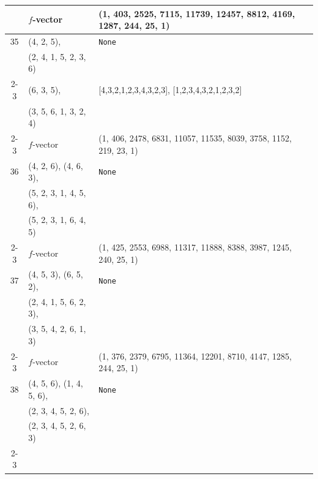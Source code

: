 \documentclass[10pt]{amsart}
\numberwithin{equation}{section}
\theoremstyle{plain}
\theoremstyle{definition}
\theoremstyle{remark}
\begin{document}
{\begin{longtable}{c|l|l}
		& $f$-vector & {(1, 403, 2525, 7115, 11739, 12457, 8812, 4169, 1287, 244, 25, 1)} \\
		\midrule
		
		35 & (4, 2, 5), & \texttt{None} \\
		& (2, 4, 1, 5, 2, 3, 6) &  \\ \cline{2-3}
		
		& (6, 3, 5), & [4,3,2,1,2,3,4,3,2,3], [1,2,3,4,3,2,1,2,3,2] \\
		& (3, 5, 6, 1, 3, 2, 4) &  \\ \cline{2-3}
		
		& $f$-vector & {(1, 406, 2478, 6831, 11057, 11535, 8039, 3758, 1152, 219, 23, 1)} \\
		\midrule
		
		36 & (4, 2, 6), (4, 6, 3), & \texttt{None} \\
		& (5, 2, 3, 1, 4, 5, 6), &  \\
		& (5, 2, 3, 1, 6, 4, 5) &  \\ \cline{2-3}
		
		& $f$-vector & {(1, 425, 2553, 6988, 11317, 11888, 8388, 3987, 1245, 240, 25, 1)} \\
		\midrule
		
		37 & (4, 5, 3), (6, 5, 2), & \texttt{None} \\
		& (2, 4, 1, 5, 6, 2, 3), &  \\
		& (3, 5, 4, 2, 6, 1, 3) &  \\ \cline{2-3}
		
		& $f$-vector & {(1, 376, 2379, 6795, 11364, 12201, 8710, 4147, 1285, 244, 25, 1)} \\
		\midrule
		
		38 & (4, 5, 6), (1, 4, 5, 6), & \texttt{None} \\
		& (2, 3, 4, 5, 2, 6), &  \\
		& (2, 3, 4, 5, 2, 6, 3) &  \\ \cline{2-3}
		

\end{longtable}}
\end{document}
